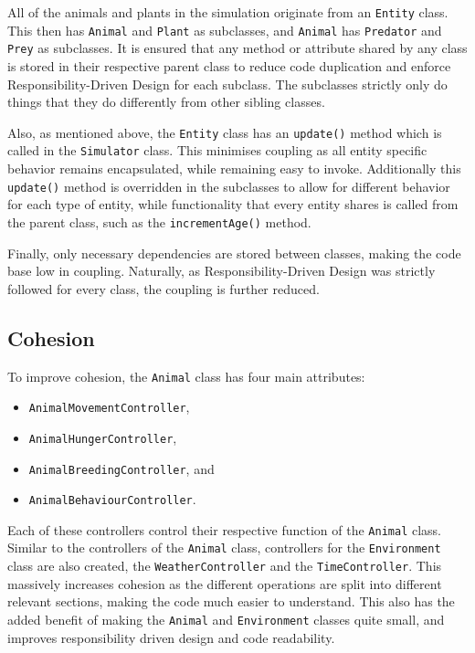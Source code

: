 \documentclass[10pt, a4paper]{scrartcl}
\begin{document}
\begin{multicols}{2}
        \noindent All of the animals and plants in the simulation originate from an \verb|Entity| class. This then has
        \verb|Animal| and \verb|Plant| as subclasses, and \verb|Animal| has \verb|Predator| and \verb|Prey| as subclasses.
        It is ensured that any method or attribute shared by any class is stored in their respective parent class to reduce
        code duplication and enforce Responsibility-Driven Design for each subclass. The subclasses strictly only do things
        that they do differently from other sibling classes.

        \noindent Also, as mentioned above, the \verb|Entity| class has an \verb|update()| method which is called in the
        \verb|Simulator| class. This minimises coupling as all entity specific behavior remains encapsulated, while remaining
        easy to invoke. Additionally this \verb|update()| method is overridden in the subclasses to allow for different
        behavior for each type of entity, while functionality that every entity shares is called from the parent class, such as
        the \verb|incrementAge()| method.

        \noindent Finally, only necessary dependencies are stored between classes, making the code base low in coupling.
        Naturally, as Responsibility-Driven Design was strictly followed for every class, the coupling is further reduced.

        \subsection{Cohesion}
        \noindent To improve cohesion, the \verb|Animal| class has four main attributes:
        \begin{itemize}
            \setlength\itemsep{-0.25em}
            \item \verb|AnimalMovementController|,
            \item \verb|AnimalHungerController|,
            \item \verb|AnimalBreedingController|, and
            \item \verb|AnimalBehaviourController|.
        \end{itemize}
        Each of these controllers
        control their respective function of the \verb|Animal| class. Similar to the controllers of the \verb|Animal| class, controllers
        for the \verb|Environment| class are also created, the \verb|WeatherController| and the \verb|TimeController|.
        This massively increases cohesion as the different operations
        are split into different relevant sections, making the code much easier to understand. This also has the added benefit of making
        the \verb|Animal| and \verb|Environment| classes quite small, and improves responsibility driven design and code readability.


\end{multicols}
\end{document}
